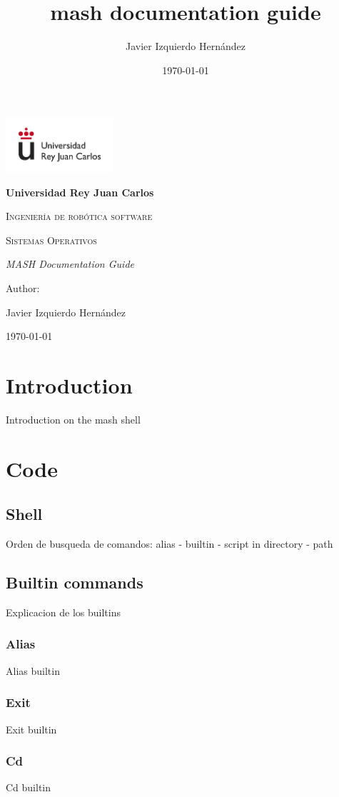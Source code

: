 \documentclass[12pt,a4paper]{report}
\title{mash documentation guide}
\author{Javier Izquierdo Hernández}
\date{\today}
\begin{document}
	\begin{titlepage}
		\centering
		{\includegraphics[width=0.3\textwidth]{logo}\par}
		\vspace{1cm}
		{\bfseries\LARGE Universidad Rey Juan Carlos \par}
		\vspace{1cm}
		{\scshape\Large Ingeniería de robótica software \par}
		\vspace{3cm}
		{\scshape\Huge Sistemas Operativos \par}
		\vspace{3cm}
		{\itshape\Large MASH Documentation Guide \par}
		\vfill
		{\Large Author: \par}
		{\Large Javier Izquierdo Hernández \par}
		\vfill
		{\Large \today \par}
	\end{titlepage}
	\newpage
	\tableofcontents
	\newpage
\part{Introduction}
Introduction on the mash shell
\part{Code}
\chapter{Shell}
Orden de busqueda de comandos: alias - builtin - script in directory - path
\chapter{Builtin commands}
Explicacion de los builtins
\section{Alias}
Alias builtin
\section{Exit}
Exit builtin
\section{Cd}
Cd builtin
\end{document}
